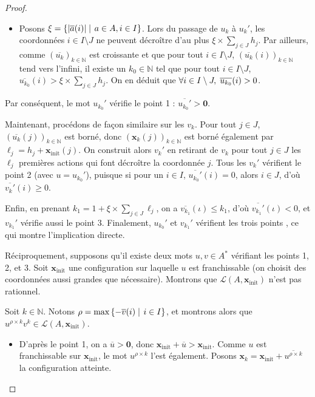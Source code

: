 \documentclass[a4paper,final]{article}
\theoremstyle{definition}
\let\leq\leqslant
\let\geq\geqslant
\newcommand{\set}[2]{\left\{#1\mathrel{\left|\vphantom{#1}\vphantom{#2}\right.}#2\right\}}
\newcommand{\abs}[1]{\ensuremath{\displaystyle\left\lvert #1 \right\rvert}}
\newcommand{\N}{\ensuremath{\mathbb{N}}}
\newcommand{\lang}{\ensuremath{\mathcal{L}}}
\newcommand{\vect}[1]{\ensuremath{\mathbf{#1}}}
\newcommand{\xinit}{\ensuremath{\vect{x}_\text{init}}}
\newcommand{\valeur}[1]{\ensuremath{\overline{#1}}}
\begin{document}
\begin{proof}
\begin{itemize}
    \item Posons $\xi = \set{\abs{\valeur{a}(i)}} {a\in A,i\in I}$.
    Lors du passage de $u_k$ à $u_k'$, les coordonnées $i\in I\setminus J$ ne peuvent décroître d'au plus $\xi \times \sum_{j\in J} h_j$.
    Par ailleurs, comme $(\valeur{u_k})_{k\in\N}$ est croissante et que pour tout $i\in I\setminus J$, $(\valeur{u_k}(i))_{k\in\N}$ tend vers l'infini, 
    il existe un $k_0\in\N$ tel que pour tout $i\in I\setminus J$, $\valeur{u_{k_0}}(i) > \xi \times \sum_{j\in J} h_j$.
    On en déduit que $\forall i\in I\setminus J, \hspace{1mm} \valeur{u_{k_0}}(i) > 0$.
\end{itemize}
Par conséquent, le mot $u_{k_0}'$ vérifie le point 1 %
: $\valeur{u_{k_0}'} > \vect{0}$.
\vspace{2mm}

Maintenant, procédons de façon similaire sur les $v_k$.
Pour tout $j\in J$, $(\valeur{u_k}(j))_{k\in\N}$ est borné, donc $(\vect{x}_k(j))_{k\in\N}$ est borné également par $\ell_j = h_j + \xinit(j)$.
On construit alors $v_k'$ en retirant de $v_k$ pour tout $j\in J$ les $\ell_j$ premières actions qui font décroître la coordonnée $j$.
Tous les $v_k'$ vérifient le point 2 (avec $u = u_{k_0}'$), puisque si pour un $i\in I$, $\valeur{u_{k_0}'}(i) = 0$, alors $i\in J$, d'où $\valeur{v_k'}(i) \geq 0$.

Enfin, en prenant $k_1 = 1 + \xi \times \sum_{j\in J} \ell_j$, on a $\valeur{v_{k_1}}(\iota) \leq k_1$, d'où $\valeur{v_{k_1}'}(\iota) < 0$, et $v_{k_1}'$ vérifie aussi le point 3.
Finalement, $u_{k_0}'$ et $v_{k_1}'$ vérifient les trois points %
, ce qui montre l'implication directe.
\vspace{5mm}

Réciproquement, supposons qu'il existe deux mots $u,v\in A^*$ vérifiant les points 1, 2, et 3.
Soit $\xinit$ une configuration sur laquelle $u$ est franchissable (on choisit des coordonnées aussi grandes que nécessaire).
Montrons que $\lang(A,\xinit)$ n'est pas rationnel.

Soit $k\in\N$.
Notons $\rho = \text{max}\set{-\valeur{v}(i)}{i\in I}$, 
et montrons alors que $u^{\rho\times k} v^k \in \lang(A,\xinit)$.

\begin{itemize}
    \item D'après le point 1, on a $\valeur{u} > \vect{0}$, donc $\xinit + \valeur{u} > \xinit$.
    Comme $u$ est franchissable sur $\xinit$, le mot $u^{\rho\times k}$ l'est également.
    Posons $\vect{x}_k = \xinit + \valeur{u^{\rho\times k}}$ la configuration atteinte.
    

\end{itemize}
\end{proof}
\end{document}
